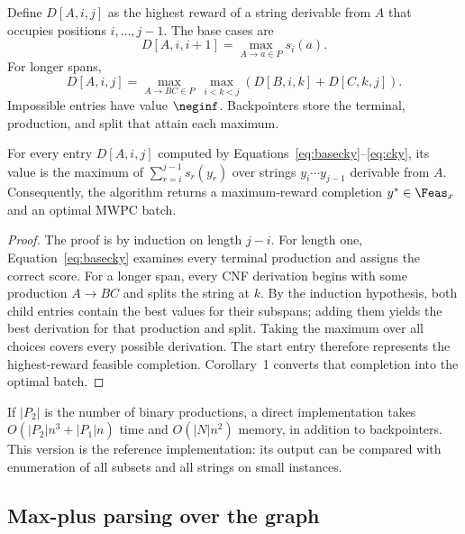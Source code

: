 Define $D[A,i,j]$ as the highest reward of a string derivable from $A$ that occupies positions $i,\ldots,j-1$. The base cases are
\begin{equation}
D[A,i,i+1]=\max_{A\rightarrow a\in P}s_i(a).
\label{eq:basecky}
\end{equation}
For longer spans,
\begin{equation}
D[A,i,j]=
\max_{A\rightarrow BC\in P}\ \max_{i<k<j}
\left(D[B,i,k]+D[C,k,j]\right).
\label{eq:cky}
\end{equation}
Impossible entries have value $\neginf$. Backpointers store the terminal, production, and split that attain each maximum.



\begin{theorem}
For every entry $D[A,i,j]$ computed by Equations~\ref{eq:basecky}--\ref{eq:cky}, its value is the maximum of $\sum_{r=i}^{j-1}s_r(y_r)$ over strings $y_i\cdots y_{j-1}$ derivable from $A$. Consequently, the algorithm returns a maximum-reward completion $y^*\in\Feas_x$ and an optimal MWPC batch.
\end{theorem}

\begin{proof}
The proof is by induction on length $j-i$. For length one, Equation~\ref{eq:basecky} examines every terminal production and assigns the correct score. For a longer span, every CNF derivation begins with some production $A\rightarrow BC$ and splits the string at $k$. By the induction hypothesis, both child entries contain the best values for their subspans; adding them yields the best derivation for that production and split. Taking the maximum over all choices covers every possible derivation. The start entry therefore represents the highest-reward feasible completion. Corollary~1 converts that completion into the optimal batch.
\end{proof}

If $|P_2|$ is the number of binary productions, a direct implementation takes $O(|P_2|n^3+|P_1|n)$ time and $O(|N|n^2)$ memory, in addition to backpointers. This version is the reference implementation: its output can be compared with enumeration of all subsets and all strings on small instances.

\subsection{Max-plus parsing over the graph}

